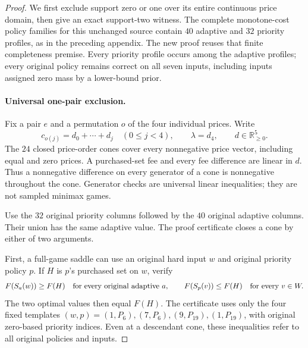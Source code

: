 \begin{proof}
We first exclude support zero or one over its entire continuous price
domain, then give an exact support-two witness. The complete monotone-cost
policy families for this unchanged source contain $40$ adaptive and $32$
priority profiles, as in the preceding appendix. The new proof reuses that
finite completeness premise. Every priority profile occurs among the
adaptive profiles; every original policy remains correct on all seven
inputs, including inputs assigned zero mass by a lower-bound prior.

\paragraph*{Universal one-pair exclusion.}
Fix a pair $e$ and a permutation $o$ of the four individual prices. Write
\[
 c_{o(j)}=d_0+\cdots+d_j\quad(0\leq j<4),\qquad
 \lambda=d_4,\qquad d\in\mathbb R_{\geq0}^{5}.
\]
The $24$ closed price-order cones cover every nonnegative price vector,
including equal and zero prices. A purchased-set fee and every fee
difference are linear in $d$. Thus a nonnegative difference on every
generator of a cone is nonnegative throughout the cone. Generator checks
are universal linear inequalities; they are not sampled minimax games.

Use the $32$ original priority columns followed by the $40$ original
adaptive columns. Their union has the same adaptive value. The proof
certificate closes a cone by either of two arguments.

First, a full-game saddle can use an original hard input $w$ and original
priority policy $p$. If $H$ is $p$'s purchased set on $w$, verify
\[
 F(S_a(w))\geq F(H)\quad\hbox{for every original adaptive }a,
 \qquad
 F(S_p(v))\leq F(H)\quad\hbox{for every }v\in W.
\]
The two optimal values then equal $F(H)$. The certificate uses only the
four fixed templates $(w,p)=(1,P_6),(7,P_6),(9,P_{19}),(1,P_{19})$,
with original zero-based priority indices. Even at a descendant cone,
these inequalities refer to all original policies and inputs.


\end{proof}
